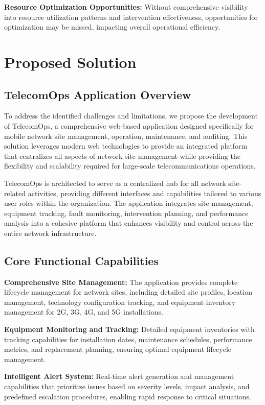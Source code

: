 \textbf{Resource Optimization Opportunities:} Without comprehensive visibility into resource utilization patterns and intervention effectiveness, opportunities for optimization may be missed, impacting overall operational efficiency.

\section{Proposed Solution}

\subsection{TelecomOps Application Overview}

To address the identified challenges and limitations, we propose the development of TelecomOps, a comprehensive web-based application designed specifically for mobile network site management, operation, maintenance, and auditing. This solution leverages modern web technologies to provide an integrated platform that centralizes all aspects of network site management while providing the flexibility and scalability required for large-scale telecommunications operations.

TelecomOps is architected to serve as a centralized hub for all network site-related activities, providing different interfaces and capabilities tailored to various user roles within the organization. The application integrates site management, equipment tracking, fault monitoring, intervention planning, and performance analysis into a cohesive platform that enhances visibility and control across the entire network infrastructure.

\subsection{Core Functional Capabilities}

\textbf{Comprehensive Site Management:} The application provides complete lifecycle management for network sites, including detailed site profiles, location management, technology configuration tracking, and equipment inventory management for 2G, 3G, 4G, and 5G installations.

\textbf{Equipment Monitoring and Tracking:} Detailed equipment inventories with tracking capabilities for installation dates, maintenance schedules, performance metrics, and replacement planning, ensuring optimal equipment lifecycle management.

\textbf{Intelligent Alert System:} Real-time alert generation and management capabilities that prioritize issues based on severity levels, impact analysis, and predefined escalation procedures, enabling rapid response to critical situations.

